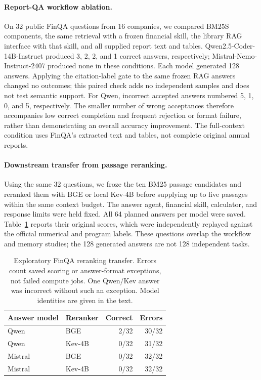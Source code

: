 \paragraph{Report-QA workflow ablation.}
On 32 public FinQA questions from 16 companies, we compared BM25S components,
the same retrieval with a frozen financial skill, the library RAG interface with
that skill, and all supplied report text and tables. Qwen2.5-Coder-14B-Instruct
produced 3, 2, 2, and 1 correct answers, respectively; Mistral-Nemo-Instruct-2407
produced none in these conditions. Each model generated 128 answers. Applying
the citation-label gate to the same frozen RAG answers changed no outcomes;
this paired check adds no independent samples and does not test semantic support.
For Qwen, incorrect accepted answers numbered 5, 1, 0, and 5, respectively.
The smaller number of wrong acceptances therefore accompanies low correct
completion and frequent rejection or format failure, rather than demonstrating
an overall accuracy improvement. The full-context condition uses FinQA's
extracted text and tables, not complete original annual reports.

\paragraph{Downstream transfer from passage reranking.}
Using the same 32 questions, we froze the ten BM25 passage candidates and
reranked them with BGE or local Kev-4B before supplying up to five passages
within the same context budget. The answer agent, financial skill, calculator,
and response limits were held fixed. All 64 planned answers per model were
saved. Table~\ref{tab:finqa-rerank-final} reports their original scores, which
were independently replayed against the official numerical and program labels.
These questions overlap the workflow and memory studies; the 128 generated
answers are not 128 independent tasks.

\begin{table}[t]
\centering\small
\begin{tabular}{llrr}
\toprule
Answer model & Reranker & Correct & Errors \\
\midrule
Qwen & BGE & 2/32 & 30/32 \\
Qwen & Kev-4B & 0/32 & 31/32 \\
Mistral & BGE & 0/32 & 32/32 \\
Mistral & Kev-4B & 0/32 & 32/32 \\
\bottomrule
\end{tabular}
\caption{Exploratory FinQA reranking transfer. Errors count saved scoring or
answer-format exceptions, not failed compute jobs. One Qwen/Kev answer was
incorrect without such an exception. Model identities are given in the text.}
\label{tab:finqa-rerank-final}
\end{table}

